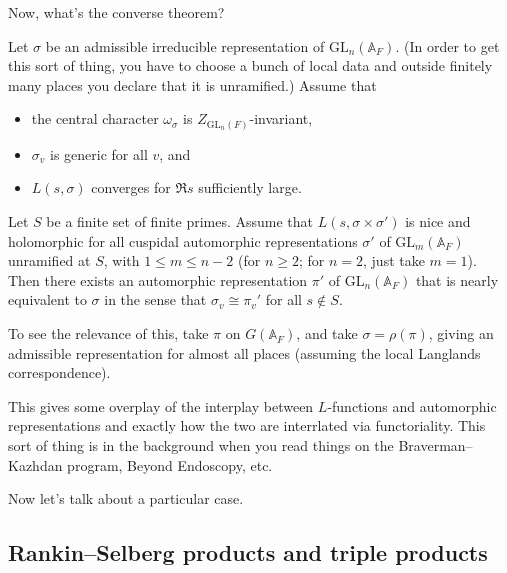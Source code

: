 \documentclass[reqno]{amsart} 
\numberwithin{theorem}{section}
\numberwithin{equation}{section}
\numberwithin{exercise}{section}
\begin{document}
Now, what's the converse theorem?
\begin{theorem}\label{theorem:cq6tho7vvs}
  Let $\sigma$ be an admissible irreducible representation of $\mathrm{GL}_n(\mathbb{A}_F)$.  (In order to get this sort of thing, you have to choose a bunch of local data and outside finitely many places you declare that it is unramified.)  Assume that
  \begin{itemize}
  \item the central character $\omega_\sigma$ is $Z_{\mathrm{GL}_n(F)}$-invariant,
  \item $\sigma_v$ is generic for all $v$, and
  \item $L(s, \sigma)$ converges for $\Re s$ sufficiently large.
  \end{itemize}
  Let $S$ be a finite set of finite primes.  Assume that $L(s, \sigma \times \sigma ')$ is nice and holomorphic for all cuspidal automorphic representations $\sigma '$ of $\mathrm{GL}_m(\mathbb{A}_F)$ unramified at $S$, with $1 \leq m \leq n - 2$ (for $n \geq 2$; for $n = 2$, just take $m = 1$).  Then there exists an automorphic representation $\pi '$ of $\mathrm{GL}_n(\mathbb{A}_F)$ that is nearly equivalent to $\sigma$ in the sense that $\sigma_v \cong \pi_v '$ for all $s \notin S$.
\end{theorem}
To see the relevance of this, take $\pi$ on $G(\mathbb{A}_F)$, and take $\sigma = \rho(\pi)$, giving an admissible representation for almost all places (assuming the local Langlands correspondence).

This gives some overplay of the interplay between $L$-functions and automorphic representations and exactly how the two are interrlated via functoriality.  This sort of thing is in the background when you read things on the Braverman--Kazhdan program, Beyond Endoscopy, etc.

Now let's talk about a particular case.

\subsection{Rankin--Selberg products and triple products}\label{sec:cq6tho1yti}
\end{document}

